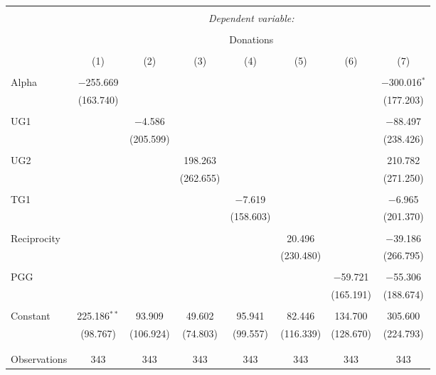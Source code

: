 \documentclass[12pt]{article}
\begin{document}
\begin{table}[!htbp] \centering 
  \caption{} 
  \label{} 
      \begin{adjustbox}{width=\textwidth}
\begin{tabular}{@{\extracolsep{5pt}}lccccccc} 
\\[-1.8ex]\hline 
\hline \\[-1.8ex] 
 & \multicolumn{7}{c}{\textit{Dependent variable:}} \\ 
\cline{2-8} 
\\[-1.8ex] & \multicolumn{7}{c}{Donations} \\ 
\\[-1.8ex] & (1) & (2) & (3) & (4) & (5) & (6) & (7)\\ 
\hline \\[-1.8ex] 
 Alpha & $-$255.669 &  &  &  &  &  & $-$300.016$^{*}$ \\ 
  & (163.740) &  &  &  &  &  & (177.203) \\ 
  & & & & & & & \\ 
 UG1 &  & $-$4.586 &  &  &  &  & $-$88.497 \\ 
  &  & (205.599) &  &  &  &  & (238.426) \\ 
  & & & & & & & \\ 
 UG2 &  &  & 198.263 &  &  &  & 210.782 \\ 
  &  &  & (262.655) &  &  &  & (271.250) \\ 
  & & & & & & & \\ 
 TG1 &  &  &  & $-$7.619 &  &  & $-$6.965 \\ 
  &  &  &  & (158.603) &  &  & (201.370) \\ 
  & & & & & & & \\ 
 Reciprocity &  &  &  &  & 20.496 &  & $-$39.186 \\ 
  &  &  &  &  & (230.480) &  & (266.795) \\ 
  & & & & & & & \\ 
 PGG &  &  &  &  &  & $-$59.721 & $-$55.306 \\ 
  &  &  &  &  &  & (165.191) & (188.674) \\ 
  & & & & & & & \\ 
 Constant & 225.186$^{**}$ & 93.909 & 49.602 & 95.941 & 82.446 & 134.700 & 305.600 \\ 
  & (98.767) & (106.924) & (74.803) & (99.557) & (116.339) & (128.670) & (224.793) \\ 
  & & & & & & & \\ 
\hline \\[-1.8ex] 
Observations & 343 & 343 & 343 & 343 & 343 & 343 & 343 \\ 

\end{tabular}
\end{adjustbox}
\end{table}
\end{document}
